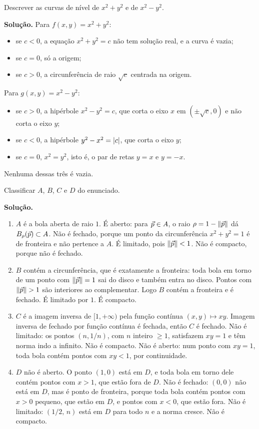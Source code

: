 \documentclass[11pt,a4paper]{article}
\begin{document}
\begin{exercicio}
Descrever as curvas de nível de $x^2+y^2$ e de $x^2-y^2$.

\textbf{Solução.}
Para $f(x,y)=x^2+y^2$:
\begin{itemize}[leftmargin=1.4em]
\item se $c<0$, a equação $x^2+y^2=c$ não tem solução real, e a curva é vazia;
\item se $c=0$, só a origem;
\item se $c>0$, a circunferência de raio $\sqrt{c}$ centrada na origem.
\end{itemize}
Para $g(x,y)=x^2-y^2$:
\begin{itemize}[leftmargin=1.4em]
\item se $c>0$, a hipérbole $x^2-y^2=c$, que corta o eixo $x$ em $(\pm\sqrt{c},0)$ e não corta o eixo $y$;
\item se $c<0$, a hipérbole $y^2-x^2=\left\lvert c \right\rvert$, que corta o eixo $y$;
\item se $c=0$, $x^2=y^2$, isto é, o par de retas $y=x$ e $y=-x$.
\end{itemize}
Nenhuma dessas três é vazia.
\end{exercicio}

\begin{exercicio}
Classificar $A$, $B$, $C$ e $D$ do enunciado.

\textbf{Solução.}
\begin{enumerate}[label=\alph*)]
\item $A$ é a bola aberta de raio $1$. É aberto: para $\vec{p}\in A$, o raio $\rho=1-\left\lVert \vec{p} \right\rVert$ dá $B_\rho(\vec{p})\subset A$. Não é fechado, porque um ponto da circunferência $x^2+y^2=1$ é de fronteira e não pertence a $A$. É limitado, pois $\left\lVert \vec{p} \right\rVert<1$. Não é compacto, porque não é fechado.

\item $B$ contém a circunferência, que é exatamente a fronteira: toda bola em torno de um ponto com $\left\lVert \vec{p} \right\rVert=1$ sai do disco e também entra no disco. Pontos com $\left\lVert \vec{p} \right\rVert>1$ são interiores ao complementar. Logo $B$ contém a fronteira e é fechado. É limitado por $1$. É compacto.

\item $C$ é a imagem inversa de $[1,+\infty)$ pela função contínua $(x,y)\mapsto xy$. Imagem inversa de fechado por função contínua é fechada, então $C$ é fechado. Não é limitado: os pontos $(n,1/n)$, com $n$ inteiro $\ge 1$, satisfazem $xy=1$ e têm norma indo a infinito. Não é compacto. Não é aberto: num ponto com $xy=1$, toda bola contém pontos com $xy<1$, por continuidade.

\item $D$ não é aberto. O ponto $(1,0)$ está em $D$, e toda bola em torno dele contém pontos com $x>1$, que estão fora de $D$. Não é fechado: $(0,0)$ não está em $D$, mas é ponto de fronteira, porque toda bola contém pontos com $x>0$ pequeno, que estão em $D$, e pontos com $x<0$, que estão fora. Não é limitado: $(1/2,\,n)$ está em $D$ para todo $n$ e a norma cresce. Não é compacto.
\end{enumerate}
\end{exercicio}
\end{document}
